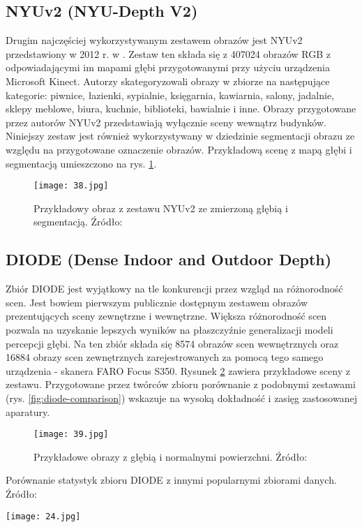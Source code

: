 \subsection{NYUv2 (NYU-Depth V2)}
Drugim najczęściej wykorzystywanym zestawem obrazów jest NYUv2 przedstawiony w 2012 r. w \cite{couprie2013}. Zestaw ten składa się z 407024 obrazów RGB z odpowiadającymi im mapami głębi przygotowanymi przy użyciu urządzenia Microsoft Kinect. Autorzy skategoryzowali obrazy w zbiorze na następujące kategorie: piwnice, łazienki, sypialnie, księgarnia, kawiarnia, salony, jadalnie, sklepy meblowe, biura, kuchnie, biblioteki, bawialnie i inne. Obrazy przygotowane przez autorów NYUv2 przedstawiają wyłącznie sceny wewnątrz budynków. Niniejszy zestaw jest również wykorzystywany w dziedzinie segmentacji obrazu ze względu na przygotowane oznaczenie obrazów. Przykładową scenę z mapą głębi i segmentacją umieszczono na rys. \ref{fig:nyuv2-example}.
\begin{figure}[H]
    \centering
    \texttt{[image: 38.jpg]}
    \caption{Przykładowy obraz z zestawu NYUv2 ze zmierzoną głębią i segmentacją. Źródło: \cite{couprie2013}}
    \label{fig:nyuv2-example}
\end{figure}

\subsection{DIODE (Dense Indoor and Outdoor Depth)}
Zbiór DIODE \cite{vasiljevic2019} jest wyjątkowy na tle konkurencji przez wzgląd na różnorodność scen. Jest bowiem pierwszym publicznie dostępnym zestawem obrazów prezentujących sceny zewnętrzne i wewnętrzne. Większa różnorodność scen pozwala na uzyskanie lepszych wyników na płaszczyźnie generalizacji modeli percepcji głębi. Na ten zbiór składa się 8574 obrazów scen wewnętrznych oraz 16884 obrazy scen zewnętrznych zarejestrowanych za pomocą tego samego urządzenia - skanera FARO Focus S350. Rysunek \ref{fig:diode-example} zawiera przykładowe sceny z zestawu. Przygotowane przez twórców zbioru porównanie z podobnymi zestawami (rys. \ref{fig:diode-comparison}) wskazuje na wysoką dokładność i zasięg zastosowanej aparatury.
\begin{figure}[H]
    \centering
    \texttt{[image: 39.jpg]}
    \caption{Przykładowe obrazy z głębią i normalnymi powierzchni. Źródło: \cite{vasiljevic2019}}
    \label{fig:diode-example}
\end{figure}
\begin{table}[H]
    \centering
    \caption{Porównanie statystyk zbioru DIODE z innymi popularnymi zbiorami danych. Źródło: \cite{vasiljevic2019}}
    \texttt{[image: 24.jpg]}
    \label{fig:diode-comparison}
\end{table}

